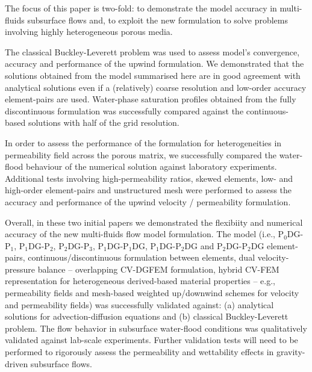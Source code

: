 \documentclass[preprint,authoryear,12pt]{elsarticle}
\newcommand{\PN}[2][error]{P$_{#1}$DG-P$_{#2}$}
\begin{document}
The focus of this paper is two-fold: to demonstrate the model accuracy in multi-fluids subsurface flows and, to exploit the new formulation to solve problems involving highly heterogeneous porous media.        

The classical Buckley-Leverett problem was used to assess model's convergence, accuracy and performance of the upwind formulation. We demonstrated that the solutions obtained from the model summarised here \citep[see][for a full description]{gomes_2013} are in good agreement with analytical solutions even if a (relatively) coarse resolution and low-order accuracy element-pairs are used.  Water-phase saturation profiles obtained from the fully discontinuous formulation was successfully compared against the continuous-based solutions with half of the grid resolution. 

In order to assess the performance of the formulation for heterogeneities in permeability field across the porous matrix, we successfully compared the water-flood behaviour of the numerical solution against laboratory experiments. Additional tests involving high-permeability ratios, skewed elements, low- and high-order element-pairs and unstructured mesh were performed to assess the accuracy and performance of the upwind velocity / permeability formulation.

Overall, in these two initial papers we demonstrated the flexibiity and numerical accuracy of the new multi-fluids flow model formulation. The model (i.e., \PN[0]{1}, \PN[1]{2}, \PN[2]{3}, \PN[1]{1}DG, \PN[1]{2}DG and \PN[2]{2}DG element-pairs, continuous/discontinuous formulation between elements, dual velocity-pressure balance -- overlapping CV-DGFEM formulation, hybrid CV-FEM representation for heterogeneous derived-based material properties -- e.g.,  permeability fields and mesh-based weighted up/downwind schemes for velocity and permeability fields) was successfully validated against: (a) analytical solutions for advection-diffusion equations and (b) classical Buckley-Leverett problem. The flow behavior in subsurface water-flood conditions was qualitatively validated against lab-scale experiments. Further validation tests will need to be performed to rigorously assess the permeability and wettability effects in gravity-driven subsurface flows.  

  
\end{document}
